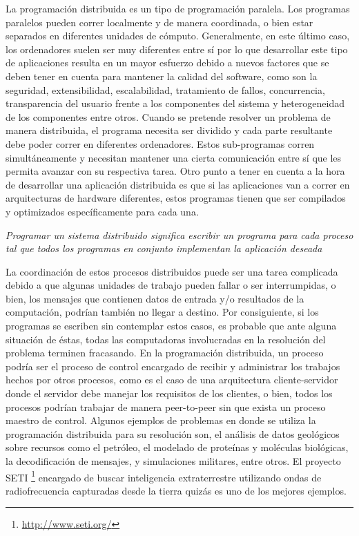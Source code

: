 La programación distribuida es un tipo de programación paralela. Los programas paralelos pueden correr localmente y de manera coordinada, o bien estar separados en diferentes unidades de cómputo.
 Generalmente, en este último caso, los ordenadores suelen ser muy diferentes entre sí por lo que desarrollar este tipo de aplicaciones resulta en un mayor esfuerzo debido a nuevos factores que se
 deben tener en cuenta para mantener la calidad del software, como son la seguridad, extensibilidad, escalabilidad, tratamiento de fallos, concurrencia, transparencia del usuario frente a los componentes
 del sistema y heterogeneidad de los componentes  entre otros. Cuando se pretende resolver un problema de manera distribuida, el programa necesita ser dividido y cada parte resultante debe poder correr
 en diferentes ordenadores. Estos sub-programas corren simultáneamente y necesitan mantener una cierta comunicación entre sí que les permita avanzar con su respectiva tarea. 
Otro punto a tener en cuenta a la hora de desarrollar una aplicación distribuida es que si las aplicaciones van a correr en arquitecturas de hardware diferentes, 
estos programas tienen que ser compilados y optimizados específicamente para cada una.

\begin{center}
\begin{itshape}
 \textit{Programar un sistema distribuido significa escribir un programa para cada proceso tal que todos los programas en conjunto implementan la aplicación deseada \cite{VanRoyHaridi} }
\end{itshape}
\end{center}

La coordinación de estos procesos distribuidos puede ser una tarea complicada debido a que algunas unidades de trabajo pueden fallar o ser interrumpidas, o bien, los mensajes que contienen
 datos de entrada y/o resultados de la computación, podrían también no llegar a destino. Por consiguiente, si los programas se escriben sin contemplar estos casos, es probable que ante alguna
 situación de éstas, todas las computadoras involucradas en la resolución del problema terminen fracasando. En la programación distribuida, un proceso podría ser el proceso de control encargado 
de recibir y administrar los trabajos hechos por otros procesos, como es el caso de una arquitectura cliente-servidor donde el servidor debe manejar los requisitos de los clientes, o bien,
 todos los procesos podrían trabajar de manera peer-to-peer sin que exista un proceso maestro de control. Algunos ejemplos de problemas en donde se utiliza la programación distribuida para
 su resolución son, el análisis de datos geológicos sobre recursos como el petróleo, el modelado de proteínas y moléculas biológicas, la decodificación de mensajes, y simulaciones militares, entre otros.
 El proyecto \textsc{SETI} \footnote{\url{http://www.seti.org/}} encargado de buscar inteligencia extraterrestre utilizando ondas de radiofrecuencia capturadas desde la tierra quizás es uno de los mejores ejemplos.

